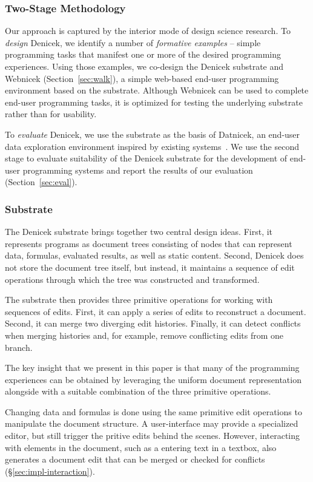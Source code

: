 \documentclass[sigconf,anonymous,screen]{acmart}
\begin{document}
\subsubsection*{Two-Stage Methodology}
Our approach is captured by the interior mode \cite{adam-2021-dsr} of design science research.
To \emph{design} Denicek, we identify a number of \emph{formative examples} -- simple programming
tasks that manifest one or more of the desired programming experiences.
Using those examples, we co-design the Denicek substrate and Webnicek (Section~\ref{sec:walk}),
a simple web-based end-user programming environment based on the substrate. Although Webnicek can
be used to complete end-user programming tasks, it is optimized for testing the underlying
substrate rather than for usability.

To \emph{evaluate} Denicek, we use the substrate as the basis of Datnicek, an end-user data
exploration environment inspired by existing systems~\cite{kandel-2011-wrangler,drossos-2020-wrex}.
We use the second stage to evaluate suitability of the Denicek substrate for the development of
end-user programming systems and report the results of our evaluation (Section~\ref{sec:eval}).

\subsubsection*{Substrate}
The Denicek substrate brings together two central design ideas. First, it represents programs as
document trees consisting of nodes that can represent data, formulas, evaluated results, as well as
static content. Second, Denicek does not store the document tree itself, but instead, it maintains
a sequence of edit operations through which the tree was constructed and transformed.

The substrate then provides three primitive operations for working with sequences of edits.
First, it can apply a series of edits to reconstruct a document. Second, it can merge two
diverging edit histories. Finally, it can detect conflicts when merging histories and, for
example, remove conflicting edits from one branch.

The key insight that we present in this paper is that many of the programming experiences can
be obtained by leveraging the uniform document representation alongside with a suitable combination
of the three primitive operations.

Changing data and formulas is done using the same primitive edit operations to
manipulate the document structure. A user-interface may provide a specialized editor, but still
trigger the pritive edits behind the scenes. However, interacting with elements in the document,
such as a entering text in a textbox, also generates a document edit that can be merged or checked
for conflicts (\S\ref{sec:impl-interaction}).
\end{document}

